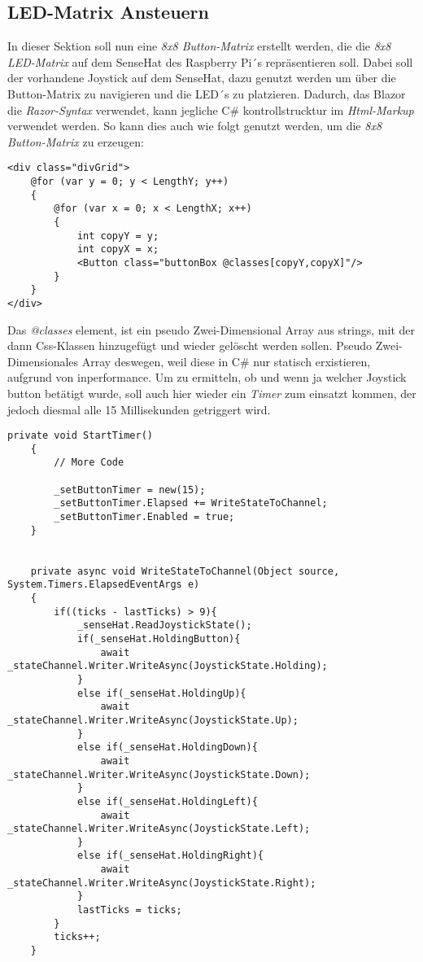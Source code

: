 \subsection{LED-Matrix Ansteuern}
\label{subsec:ledMatrix}
In dieser Sektion soll nun eine \emph{8x8 Button-Matrix} erstellt werden, die die \emph{8x8
LED-Matrix} auf dem SenseHat des Raspberry Pi´s repräsentieren soll. Dabei soll der vorhandene
Joystick auf dem SenseHat, dazu genutzt werden um über die Button-Matrix zu navigieren und die
LED´s zu platzieren.
\newline
\newline
Dadurch, das Blazor die \emph{Razor-Syntax} verwendet, kann jegliche C\# kontrollstrucktur im
\emph{Html-Markup} verwendet werden. So kann dies auch wie folgt genutzt werden, um die \emph{8x8
Button-Matrix} zu erzeugen:

\begin{lstlisting}[language={[Sharp]C}, caption=Button-Matrix,
    label=lst:ButtonMatrix]
<div class="divGrid">
    @for (var y = 0; y < LengthY; y++)
    {
        @for (var x = 0; x < LengthX; x++)
        {
            int copyY = y;
            int copyX = x;
            <Button class="buttonBox @classes[copyY,copyX]"/>
        }
    }
</div>
\end{lstlisting}

Das \emph{@classes} element, ist ein pseudo Zwei-Dimensional Array aus strings, mit der dann
Css-Klassen hinzugefügt und wieder gelöscht werden sollen. Pseudo Zwei-Dimensionales Array
deswegen, weil diese in C\# nur statisch erxistieren, aufgrund von inperformance.
\newline
\newline
Um zu ermitteln, ob und wenn ja welcher Joystick button betätigt wurde, soll auch hier wieder ein
\emph{Timer} zum einsatzt kommen, der jedoch diesmal alle 15 Millisekunden getriggert wird.

\begin{lstlisting}[language={[Sharp]C}, caption=Timer: ButtonTimer,
    label=lst:ButtonTimer]
    private void StartTimer()
    {
        // More Code

        _setButtonTimer = new(15);
        _setButtonTimer.Elapsed += WriteStateToChannel;
        _setButtonTimer.Enabled = true;
    }


    private async void WriteStateToChannel(Object source, System.Timers.ElapsedEventArgs e)
    {
        if((ticks - lastTicks) > 9){
            _senseHat.ReadJoystickState();
            if(_senseHat.HoldingButton){
                await _stateChannel.Writer.WriteAsync(JoystickState.Holding);
            }
            else if(_senseHat.HoldingUp){
                await _stateChannel.Writer.WriteAsync(JoystickState.Up);
            }
            else if(_senseHat.HoldingDown){
                await _stateChannel.Writer.WriteAsync(JoystickState.Down);
            }
            else if(_senseHat.HoldingLeft){
                await _stateChannel.Writer.WriteAsync(JoystickState.Left);
            }
            else if(_senseHat.HoldingRight){
                await _stateChannel.Writer.WriteAsync(JoystickState.Right);
            }
            lastTicks = ticks;
        }
        ticks++;
    }
\end{lstlisting}

